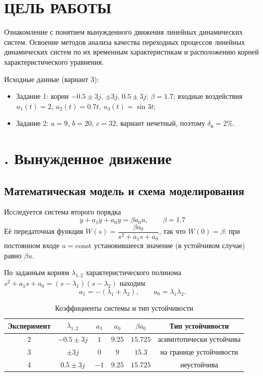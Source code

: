 \documentclass[14pt,a4paper]{extarticle}
\begin{document}
\section*{ЦЕЛЬ РАБОТЫ}

Ознакомление с понятием вынужденного движения линейных динамических систем. Освоение методов анализа качества переходных процессов линейных динамических систем по их временным характеристикам и расположению корней характеристического уравнения.

Исходные данные (вариант 3):
\begin{itemize}
  \item Задание 1: корни $-0.5\pm 3j$, $\pm 3j$, $0.5\pm 3j$; $\beta = 1.7$; входные воздействия $u_1(t) = 2$, $u_2(t) = 0.7t$, $u_3(t) = \sin 3t$;
  \item Задание 2: $a = 9$, $b = 20$, $c = 32$; вариант нечетный, поэтому $\delta_\text{п} = 2\%$.
\end{itemize}

\newpage
\section{. Вынужденное движение}

\subsection{Математическая модель и схема моделирования}

Исследуется система второго порядка
\begin{equation}\label{eq:sys}
\ddot y + a_1\dot y + a_0 y = \beta a_0 u, \qquad \beta = 1.7 
\end{equation}
Её передаточная функция $W(s) = \dfrac{\beta a_0}{s^2 + a_1 s + a_0}$, так что $W(0) = \beta$: при постоянном входе $u = \mathrm{const}$ установившееся значение (в устойчивом случае) равно $\beta u$.

По заданным корням $\lambda_{1,2}$ характеристического полинома $s^2 + a_1 s + a_0 = (s-\lambda_1)(s-\lambda_2)$ находим
\[
a_1 = -(\lambda_1+\lambda_2), \qquad a_0 = \lambda_1\lambda_2 .
\]

\begin{table}[H]
\centering
\caption{Коэффициенты системы и тип устойчивости}
\label{tab:coef}
\begin{tabular}{cccccc}
\toprule
Эксперимент & $\lambda_{1,2}$ & $a_1$ & $a_0$ & $\beta a_0$ & Тип устойчивости \\
\midrule
2 & $-0.5 \pm 3j$ & $1$  & $9.25$ & $15.725$ & асимптотически устойчива \\
3 & $\pm 3j$      & $0$  & $9$    & $15.3$   & на границе устойчивости \\
4 & $0.5 \pm 3j$  & $-1$ & $9.25$ & $15.725$ & неустойчива \\
\bottomrule
\end{tabular}
\end{table}
\end{document}
